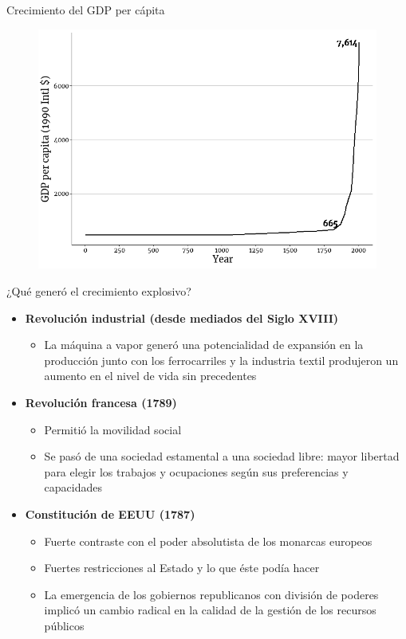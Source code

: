 \documentclass{beamer}
\begin{document}
\begin{frame}{Crecimiento del GDP per cápita}
    \begin{figure} [H]   \includegraphics[scale=0.5]{../Figures/C17.1.png}
\end{figure}
\end{frame}

\begin{frame}{¿Qué generó el crecimiento explosivo?}
    \begin{itemize}
    \item \textbf{Revolución industrial (desde mediados del Siglo XVIII)}
    \begin{itemize}
        \item La máquina a vapor generó una potencialidad de expansión en la producción junto con los ferrocarriles y la industria textil produjeron un aumento en el nivel de vida sin precedentes
    \end{itemize}
    
    \item \textbf{Revolución francesa (1789)}
    \begin{itemize}
        \item Permitió la movilidad social
        \item Se pasó de una sociedad estamental a una sociedad libre: mayor libertad para elegir los trabajos y ocupaciones según sus preferencias y capacidades
    \end{itemize}
     \item \textbf{Constitución de EEUU (1787)}
     \begin{itemize}
        \item Fuerte contraste con el poder absolutista de los monarcas europeos
        \item Fuertes restricciones al Estado y lo que éste podía hacer
        \item La emergencia de los gobiernos republicanos con división de poderes implicó un cambio radical en la calidad de la gestión de los recursos públicos
    \end{itemize}
\end{itemize}
\end{frame}
\end{document}
